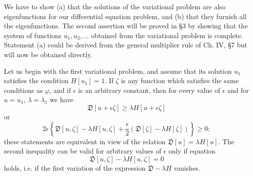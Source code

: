 We have to show (a) that the solutions of the variational problem are also eigenfunctions for our differential equation problem, and (b) that they furnish all the eigenfunctions. The second assertion will be proved in \S3 by showing that the system of functions $u_1,u_2,\ldots$ obtained from the variational problem is complete. Statement (a) could be derived from the general multiplier rule of Ch. IV, \S7 but will now be obtained directly.

Let us begin with the first variational problem, and assume that its solution $u_1$ satisfies the condition $H[u_1]=1$. If $\zeta$ is any function which satisfies the same conditions as $\varphi$, and if $\epsilon$ is an arbitrary constant, then for every value of $\epsilon$ and for $u=u_1$, $\lambda=\lambda_1$ we have
\[
\mathfrak D[u+\epsilon\zeta]\ge\lambda H[u+\epsilon\zeta]
\]
or
\[
2\epsilon\left\{\mathfrak D[u,\zeta]-\lambda H[u,\zeta]
+\frac{\epsilon}{2}(\mathfrak D[\zeta]-\lambda H[\zeta])\right\}\ge0;
\]
these statements are equivalent in view of the relation $\mathfrak D[u]=\lambda H[u]$. The second inequality can be valid for arbitrary values of $\epsilon$ only if equation
\begin{equation}\tag{4}
\mathfrak D[u,\zeta]-\lambda H[u,\zeta]=0
\end{equation}
holds, i.e. if the first variation of the expression $\mathfrak D-\lambda H$ vanishes.

